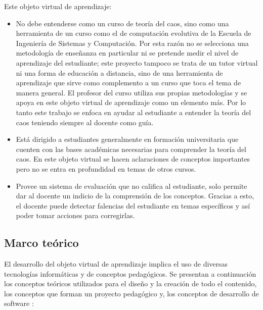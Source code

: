 \documentclass[letterpaper, 11pt, oneside]{article}
\theoremstyle{definition}
\theoremstyle{remark}
\begin{document}
Este objeto virtual de aprendizaje:
\begin{itemize}
 \item No debe entenderse como un curso de teoría del caos, sino como una herramienta de un curso como el de computación evolutiva de la Escuela de Ingeniería de Sistemas y Computación. Por esta razón no se selecciona una metodología de enseñanza en particular ni se pretende medir el nivel de aprendizaje del estudiante; este proyecto tampoco se trata de un tutor virtual ni una forma de educación a distancia, sino de una herramienta de aprendizaje que sirve como complemento a un curso que toca el tema de manera general. El profesor del curso utiliza sus propias metodologías y se apoya en este objeto virtual de aprendizaje como un elemento más. Por lo tanto este trabajo se enfoca en ayudar al estudiante a entender la teoría del caos teniendo siempre al docente como guía.
 \item Está dirigido a estudiantes generalmente en formación universitaria que cuenten con las bases académicas necesarias para comprender la teoría del caos. En este objeto virtual se hacen aclaraciones de conceptos importantes pero no se entra en profundidad en temas de otros cursos.
 \item Provee un sistema de evaluación que no califica al estudiante, solo permite dar al docente un indicio de la comprensión de los conceptos. Gracias a esto, el docente puede detectar falencias del estudiante en temas específicos y así poder tomar acciones para corregirlas.

\end{itemize}
\clearpage


\begin{center}
 \section{Marco teórico}
\end{center}
El desarrollo del objeto virtual de aprendizaje implica el uso de diversas tecnologías informáticas y de conceptos pedagógicos. Se presentan a continuación los conceptos teóricos utilizados para el diseño y la creación de todo el contenido, los conceptos que forman un proyecto pedagógico y, los conceptos de desarrollo de software :
\end{document}

